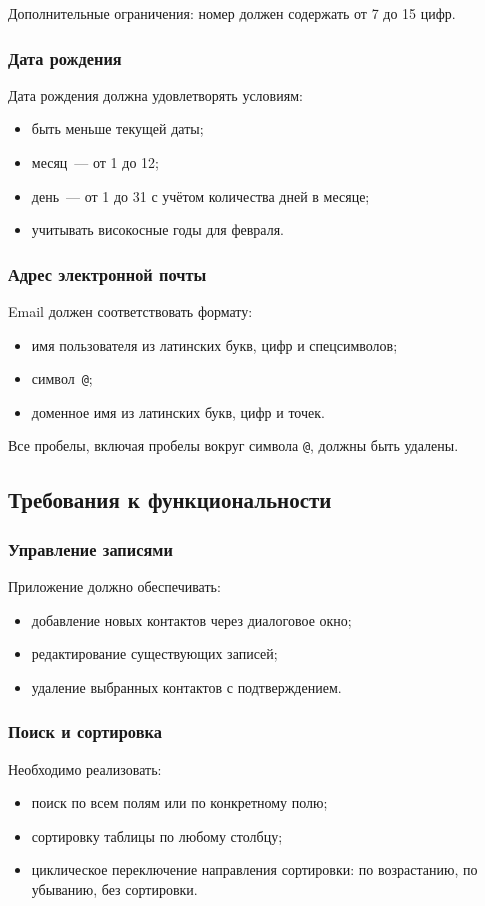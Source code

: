 Дополнительные ограничения: номер должен содержать от 7 до 15 цифр.

\subsubsection*{Дата рождения}
Дата рождения должна удовлетворять условиям:
\begin{itemize}
    \item быть меньше текущей даты;
    \item месяц~--- от 1 до 12;
    \item день~--- от 1 до 31 с учётом количества дней в месяце;
    \item учитывать високосные годы для февраля.
\end{itemize}

\subsubsection*{Адрес электронной почты}
Email должен соответствовать формату:
\begin{itemize}
    \item имя пользователя из латинских букв, цифр и спецсимволов;
    \item символ~\texttt{@};
    \item доменное имя из латинских букв, цифр и точек.
\end{itemize}

Все пробелы, включая пробелы вокруг символа \texttt{@}, должны быть удалены.

\subsection{Требования к функциональности}

\subsubsection*{Управление записями}
Приложение должно обеспечивать:
\begin{itemize}
    \item добавление новых контактов через диалоговое окно;
    \item редактирование существующих записей;
    \item удаление выбранных контактов с подтверждением.
\end{itemize}

\subsubsection*{Поиск и сортировка}
Необходимо реализовать:
\begin{itemize}
    \item поиск по всем полям или по конкретному полю;
    \item сортировку таблицы по любому столбцу;
    \item циклическое переключение направления сортировки: по возрастанию, по убыванию, без сортировки.
\end{itemize}

